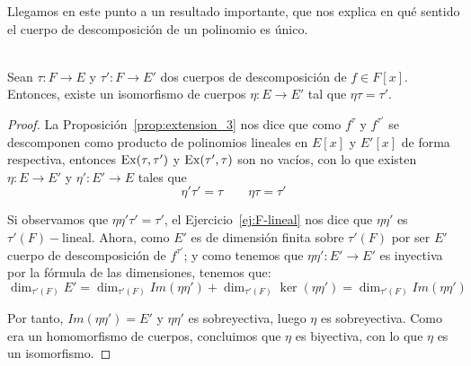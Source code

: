 Llegamos en este punto a un resultado importante, que nos explica en qué sentido el cuerpo de descomposición de un polinomio es único.
\begin{teo}\label{teo:UnicidadCuerpoDescomposicion} \ \\
    Sean $\tau:F\to E$ y $\tau':F\to E'$ dos cuerpos de descomposición de $f\in F[x]$. Entonces, existe un isomorfismo de cuerpos $\eta:E\to E'$ tal que $\eta \tau = \tau'$.
    \begin{proof}
        La Proposición~\ref{prop:extension_3} nos dice que como $f^\tau$ y $f^{\tau'}$ se descomponen como producto de polinomios lineales en $E[x]$ y $E'[x]$ de forma respectiva, entonces $\operatorname{Ex}(\tau,\tau')$ y $\operatorname{Ex}(\tau',\tau)$ son no vacíos, con lo que existen $\eta:E\to E'$ y $\eta':E'\to E$ tales que 
        \begin{equation*}
            \eta'\tau' = \tau\qquad \eta\tau = \tau'
        \end{equation*}

        Si observamos que $\eta\eta'\tau' = \tau'$, el Ejercicio~\ref{ej:F-lineal} nos dice que $\eta\eta'$ es $\tau'(F)-$lineal. Ahora, como $E'$ es de dimensión finita sobre $\tau'(F)$ por ser $E'$ cuerpo de descomposición de $f^{\tau'}$; y como tenemos que $\eta\eta':E'\to E'$ es inyectiva por la fórmula de las dimensiones, tenemos que:
        \begin{equation*}
            \dim_{\tau'(F)}E' = \dim_{\tau'(F)} Im(\eta\eta') + \dim_{\tau'(F)} \ker(\eta\eta') = \dim_{\tau'(F)} Im(\eta\eta')
        \end{equation*}

        Por tanto, $Im(\eta\eta') = E'$ y $\eta\eta'$ es sobreyectiva, luego $\eta$ es sobreyectiva. Como era un homomorfismo de cuerpos, concluimos que $\eta$ es biyectiva, con lo que $\eta$ es un isomorfismo.
    \end{proof}
\end{teo}

